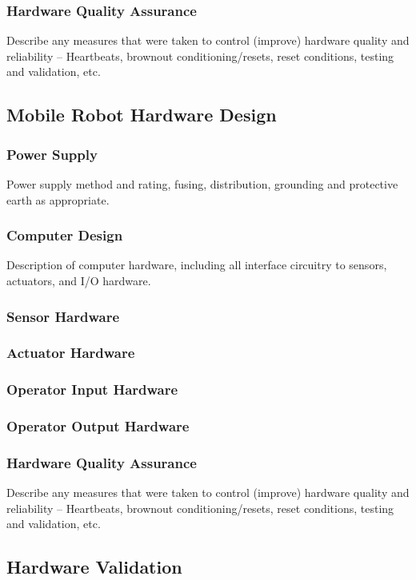 \documentclass[MTRX3700report.tex]{subfiles}
\begin{document}
    \subsubsection{Hardware Quality Assurance}
    Describe any measures that were taken to control (improve) hardware quality and reliability – Heartbeats, brownout conditioning/resets, reset conditions, testing and validation, etc.

  \subsection{Mobile Robot Hardware Design}
    \subsubsection{Power Supply}
    Power supply method and rating, fusing, distribution, grounding and protective earth as appropriate.
    \subsubsection{Computer Design}
    Description of computer hardware, including all interface circuitry to sensors, actuators, and I/O hardware.
    \subsubsection{Sensor Hardware}
    \subsubsection{Actuator Hardware}
    \subsubsection{Operator Input Hardware}
    \subsubsection{Operator Output Hardware}
    \subsubsection{Hardware Quality Assurance}
    Describe any measures that were taken to control (improve) hardware quality and reliability – Heartbeats, brownout conditioning/resets, reset conditions, testing and validation, etc.


  \subsection{Hardware Validation}
\end{document}
